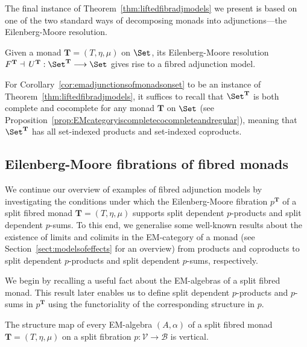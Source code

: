 The final instance of Theorem~\ref{thm:liftedfibradjmodels} we present is based on one of the two standard ways of decomposing monads into adjunctions---the Eilenberg-Moore resolution.

\begin{corollary}
\label{cor:emadjunctionsofmonadsonset}
Given a monad $\mathbf{T} = (T,\eta,\mu)$ on $\Set$, its Eilenberg-Moore resolution $F^{\mathbf{T}} \dashv\, U^{\mathbf{T}} : \Set^{\mathbf{T}} \longrightarrow \Set$ gives rise to a fibred adjunction model. 
\end{corollary}

For Corollary~\ref{cor:emadjunctionsofmonadsonset} to be an instance of Theorem~\ref{thm:liftedfibradjmodels}, it suffices to recall that $\Set^{\mathbf{T}}$ is both complete and cocomplete for any monad $\mathbf{T}$ on $\Set$ (see Proposition~\ref{prop:EMcategoryiscompletecocompleteandregular}), meaning that $\Set^{\mathbf{T}}$ has all set-indexed products and set-indexed coproducts. 
%

\subsection{Eilenberg-Moore fibrations of fibred monads}
\label{sect:fibredmonadsandEMfibs}

We continue our overview of examples of fibred adjunction models by investigating the conditions under which the Eilenberg-Moore fibration $p^{\mathbf{T}}$ of a split fibred monad ${\mathbf{T}} =(T,\eta,\mu)$ supports split dependent $p$-products and split dependent $p$-sums.
To this end, we generalise some well-known results about the existence of limits and colimits in the EM-category of a monad (see Section~\ref{sect:modelsofeffects} for an overview) from products and coproducts to split dependent $p$-products and split dependent $p$-sums, respectively. 

We begin by recalling a useful fact about the EM-algebras of a split fibred monad. This result later enables us to define split dependent $p$-products and $p$-sums in $p^{\mathbf{T}}$ using the functoriality of the corresponding structure in $p$.

\begin{proposition}
\label{prop:verticalEMalgebras}
The structure map of every EM-algebra $(A,\alpha)$ of a split fibred monad $\mathbf{T} = (T,\eta,\mu)$ on a split fibration $p : \mathcal{V} \longrightarrow \mathcal{B}$ is vertical.
\end{proposition}

